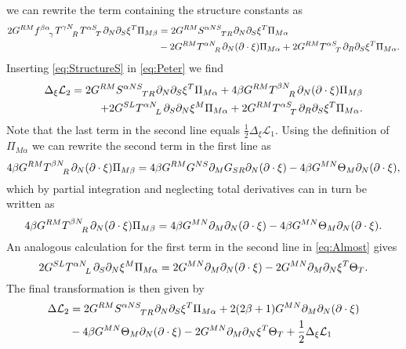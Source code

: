 we can rewrite the term containing the structure constants as 
\begin{equation}\label{eq:StructureS}
    \begin{aligned}
        2G^{RM}\tensor{f}{^{\beta\alpha}_\gamma}\tensor{T}{^{\gamma N}_R}\tensor{T}{^{\alpha S}_T}\pd_N\pd_S\xi^T\Pi_{M\beta} &= 2G^{RM}\tensor{S}{^{\alpha NS}_{TR}}\pd_N\pd_S\xi^T\Pi_{M\alpha}\\
        &-2G^{RM}\tensor{T}{^{\alpha N}_R}\pd_N(\pd\cdot\xi)\Pi_{M\alpha}+2G^{RM}\tensor{T}{^{\alpha S}_T}\pd_R\pd_S\xi^T\Pi_{M\alpha}.
    \end{aligned}
\end{equation}
Inserting \eqref{eq:StructureS} in \eqref{eq:Peter} we find 
\begin{equation}\label{eq:Almost}
    \begin{aligned}
    \Delta_\xi \mathcal{L}_2 = 2G^{RM}\tensor{S}{^{\alpha NS}_{TR}}\pd_N\pd_S\xi^T\Pi_{M\alpha}+4\beta G^{RM}\tensor{T}{^{\beta N}_R}\pd_N(\pd\cdot\xi)\Pi_{M\beta}\\
    +2G^{SL}\tensor{T}{^{\alpha N}_L}\pd_S\pd_N\xi^M\Pi_{M\alpha}+2G^{RM}\tensor{T}{^{\alpha S}_T}\pd_R\pd_S\xi^T\Pi_{M\alpha}.
    \end{aligned}
\end{equation}
Note that the last term in the second line equals $\frac{1}{2}\Delta_\xi\mathcal{L}_1$. Using the definition of $\Pi_{M\alpha}$ we can rewrite the second term in the first line as 
\begin{equation}
    4\beta G^{RM}\tensor{T}{^{\beta N}_R}\pd_N(\pd\cdot \xi)\Pi_{M\beta} = 4\beta G^{RM}G^{NS}\pd_M G_{SR}\pd_N(\pd\cdot\xi)-4\beta G^{MN}\Theta_M\pd_N(\pd\cdot\xi),
\end{equation}
which by partial integration and neglecting total derivatives can in turn be written as 
\begin{equation}
    4\beta G^{RM}\tensor{T}{^{\beta N}_R}\pd_N(\pd\cdot \xi)\Pi_{M\beta} = 4\beta G^{MN}\pd_M\pd_N(\pd\cdot\xi)-4\beta G^{MN}\Theta_M\pd_N(\pd\cdot\xi).
\end{equation}
An analogous calculation for the first term in the second line in \eqref{eq:Almost} gives 
\begin{equation}
    2G^{SL}\tensor{T}{^{\alpha N}_L}\pd_S\pd_N\xi^M\Pi_{M\alpha} = 2G^{MN}\pd_M\pd_N(\pd\cdot\xi)-2G^{MN}\pd_M\pd_N\xi^T\Theta_T.
\end{equation}
The final transformation is then given by
\begin{equation}
    \begin{aligned}
    \Delta \mathcal{L}_2 &= 2G^{RM}\tensor{S}{^{\alpha NS}_{TR}}\pd_N\pd_S\xi^T\Pi_{M\alpha}+2(2\beta+1)G^{MN}\pd_M\pd_N(\pd\cdot\xi)\\
    &-4\beta G^{MN}\Theta_M\pd_N(\pd\cdot\xi)-2G^{MN}\pd_M\pd_N\xi^T\Theta_T+\frac{1}{2}\Delta_\xi \mathcal{L}_1
    \end{aligned}
\end{equation}
